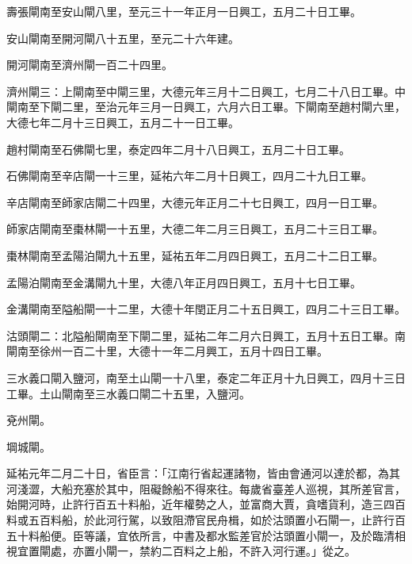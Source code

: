 \begin{pinyinscope}
 壽張閘南至安山閘八里，至元三十一年正月一日興工，五月二十日工畢。



 安山閘南至開河閘八十五里，至元二十六年建。



 開河閘南至濟州閘一百二十四里。



 濟州閘三：上閘南至中閘三里，大德元年三月十二日興工，七月二十八日工畢。中閘南至下閘二里，至治元年三月一日興工，六月六日工畢。下閘南至趙村閘六里，大德七年二月十三日興工，五月二十一日工畢。



 趙村閘南至石佛閘七里，泰定四年二月十八日興工，五月二十日工畢。



 石佛閘南至辛店閘一十三里，延祐六年二月十日興工，四月二十九日工畢。



 辛店閘南至師家店閘二十四里，大德元年正月二十七日興工，四月一日工畢。



 師家店閘南至棗林閘一十五里，大德二年二月三日興工，五月二十三日工畢。



 棗林閘南至孟陽泊閘九十五里，延祐五年二月四日興工，五月二十二日工畢。



 孟陽泊閘南至金溝閘九十里，大德八年正月四日興工，五月十七日工畢。



 金溝閘南至隘船閘一十二里，大德十年閏正月二十五日興工，四月二十三日工畢。



 沽頭閘二：北隘船閘南至下閘二里，延祐二年二月六日興工，五月十五日工畢。南閘南至徐州一百二十里，大德十一年二月興工，五月十四日工畢。



 三水義口閘入鹽河，南至土山閘一十八里，泰定二年正月十九日興工，四月十三日工畢。土山閘南至三水義口閘二十五里，入鹽河。



 兗州閘。



 堈城閘。



 延祐元年二月二十日，省臣言：「江南行省起運諸物，皆由會通河以達於都，為其河淺澀，大船充塞於其中，阻礙餘船不得來往。每歲省臺差人巡視，其所差官言，始開河時，止許行百五十料船，近年權勢之人，並富商大賈，貪嗜貨利，造三四百料或五百料船，於此河行駕，以致阻滯官民舟楫，如於沽頭置小石閘一，止許行百五十料船便。臣等議，宜依所言，中書及都水監差官於沽頭置小閘一，及於臨清相視宜置閘處，亦置小閘一，禁約二百料之上船，不許入河行運。」從之。




\end{pinyinscope}
